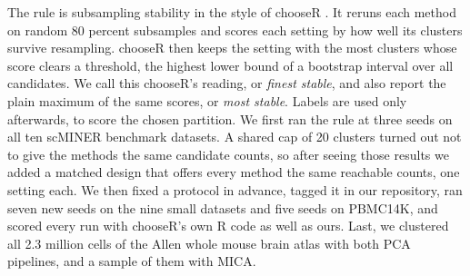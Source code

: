 The rule is subsampling stability in the style of chooseR \cite{pattersoncross2021chooser}. It reruns
each method on random 80 percent subsamples and scores each setting by how well its clusters survive
resampling. chooseR then keeps the setting with the most clusters whose score clears a threshold, the
highest lower bound of a bootstrap interval over all candidates. We call this chooseR's reading, or
\emph{finest stable}, and also report the plain maximum of the same scores, or \emph{most stable}.
Labels are used only afterwards, to score the chosen partition. We first ran the rule at three seeds on
all ten scMINER benchmark datasets. A shared cap of 20 clusters turned out not to give the methods the same
candidate counts, so after seeing those results we added a matched design that offers every method the
same reachable counts, one setting each. We then fixed a protocol in advance, tagged it in our repository,
ran seven new seeds on the nine small datasets and five seeds on PBMC14K, and scored every run with
chooseR's own R code as well as ours. Last, we clustered all 2.3 million cells of the Allen whole mouse
brain atlas \cite{yao2023allen} with both PCA pipelines, and a sample of them with MICA.

